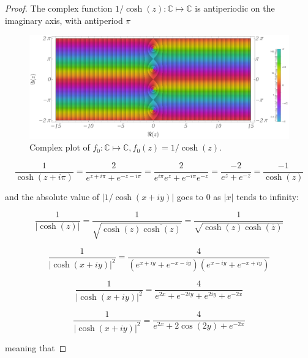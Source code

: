 \documentclass{article}
\theoremstyle{definition}
\begin{document}
\begin{proof}
    The complex function $1/\cosh(z): \mathbb{C} \mapsto \mathbb{C}$ is antiperiodic on the imaginary axis, with antiperiod $\pi$

    \begin{figure}[H]
    \centering
    \includegraphics[width=12 cm]{img/ComplexPlot.png}
    \caption{Complex plot \cite{tool:WolframComplexPlot} of $f_0 : \mathbb{C} \mapsto \mathbb{C}, f_0(z)=1/\cosh(z)$.}
    \label{fig:ComplexPlot}
    \end{figure}

    \begin{equation}
        \frac{1}{\cosh(z+i \pi)} = \frac{2}{e^{z+i \pi}+e^{-z-i \pi}} = 
        \frac{2}{e^{i \pi} e^{z}+ e^{-i \pi} e^{-z}} = \frac{-2}{ e^{z}+  e^{-z}} = \frac{-1}{\cosh(z)}
    \end{equation}

    and the absolute value of $|1/\cosh(x+i y)|$ goes to $0$ as $|x|$ tends to infinity:

    \begin{equation}
        \frac{1}{|\cosh(z)|}=\frac{1}{\sqrt{\cosh(z)\overline{\cosh(z)}}} = 
        \frac{1}{\sqrt{\cosh(z) \cosh(\overline{z})}}
    \end{equation}

    \begin{equation}
        \frac{1}{|\cosh(x+i y)|^2} = \frac{4}{(e^{x+i y}+e^{-x-i y})(e^{x-i y}+e^{-x+i y})}
    \end{equation}

    \begin{equation}
    \frac{1}{|\cosh(x+i y)|^2} = \frac{4}{e^{2 x}+e^{-2i y}+ e^{2i y} + e^{-2 x}}
    \end{equation}

    \begin{equation}
    \frac{1}{|\cosh(x+i y)|^2} = \frac{4}{e^{2 x}+2 \cos(2 y) + e^{-2 x}}
    \end{equation}

    meaning that


\end{proof}
\end{document}
